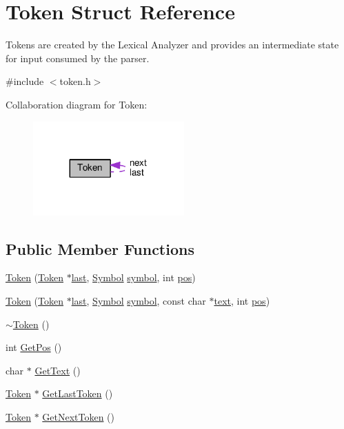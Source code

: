 \hypertarget{structToken}{}\section{Token Struct Reference}
\label{structToken}


Tokens are created by the Lexical Analyzer and provides an intermediate state for input consumed by the parser.  




{\ttfamily \#include $<$token.\+h$>$}



Collaboration diagram for Token\+:\nopagebreak
\begin{figure}[H]
\begin{center}
\leavevmode
\includegraphics[width=164pt]{structToken__coll__graph}
\end{center}
\end{figure}
\subsection*{Public Member Functions}
\begin{DoxyCompactItemize}
\item 
\hyperlink{structToken_a6331b847b4dc8cebe0e0a79c4de63204}{Token} (\hyperlink{structToken}{Token} $\ast$\hyperlink{structToken_a0ea44230386ca31fabb9a4946249d53f}{last}, \hyperlink{lex_8h_a7feef761cd73fac6e25b8bb80d2c4e54}{Symbol} \hyperlink{structToken_aa671eaaae5632c5277e89a090d864820}{symbol}, int \hyperlink{structToken_afc3014d7e8cbd70e58a55bea24fc2544}{pos})
\item 
\hyperlink{structToken_a5c78001ebd223017c11e5327667d458a}{Token} (\hyperlink{structToken}{Token} $\ast$\hyperlink{structToken_a0ea44230386ca31fabb9a4946249d53f}{last}, \hyperlink{lex_8h_a7feef761cd73fac6e25b8bb80d2c4e54}{Symbol} \hyperlink{structToken_aa671eaaae5632c5277e89a090d864820}{symbol}, const char $\ast$\hyperlink{structToken_ab2d6b41ba04b1a1e272d7e963303f8db}{text}, int \hyperlink{structToken_afc3014d7e8cbd70e58a55bea24fc2544}{pos})
\item 
\hyperlink{structToken_a3d7d59eaac1535df1433357d5d372f84}{$\sim$\+Token} ()
\item 
int \hyperlink{structToken_a5f93ea94940a6eeb060507e1da594599}{Get\+Pos} ()
\item 
char $\ast$ \hyperlink{structToken_a15f1043de07ce8e452fbf115b85def71}{Get\+Text} ()
\item 
\hyperlink{structToken}{Token} $\ast$ \hyperlink{structToken_af5213b25192a01f526143461ab47e6af}{Get\+Last\+Token} ()
\item 
\hyperlink{structToken}{Token} $\ast$ \hyperlink{structToken_ac7eb963d5eff544dd48ffc23aa274356}{Get\+Next\+Token} ()
\end{DoxyCompactItemize}
